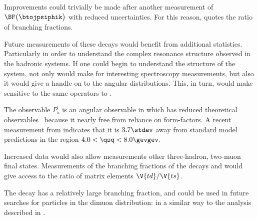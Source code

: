Improvements could trivially be made after another measurement of
$\BF\big(\btojpsiphik\big)$ with reduced uncertainties.
For this reason,  quotes the ratio of branching fractions.

Future measurements of these decays would benefit from additional statistics.
Particularly in order to understand the complex resonance structure observed in the hadronic
systems.
If one could begin to understand the structure of the \kpipi system, not only would make for
interesting spectroscopy measurements, but also it would give a handle on to the \kpipi angular
distributions.
This, in turn, would make \btokpipimumu sensitive to the same operators to \btokstrmumu.

The observable $P_5^\prime$ is an angular observable in \btokpipimumu which has reduced theoretical
observables~\cite{LHCb-PAPER-2013-037} because it nearly free from reliance on form-factors.
A recent measurement from \lhcb indicates that it is $3.7\stdev$ away from standard model
predictions in the region $4.0<\qsq<8.0\gevgev$.



Increased data would also allow measurements other three-hadron, two-muon final states.
Measurements of the branching fractions of the decays \decay{\Bp}{\pip\pipi\mumu} and
\decay{\Bp}{\kk\pip\mumu} would give access to the ratio of \ckm matrix elements $\V{td}/\V{ts}$.

The decay \btokpipimumu has a relatively large branching fraction, and could be used in future
searches for \np particles in the dimuon distribution: in a similar way to the analysis described
in .







